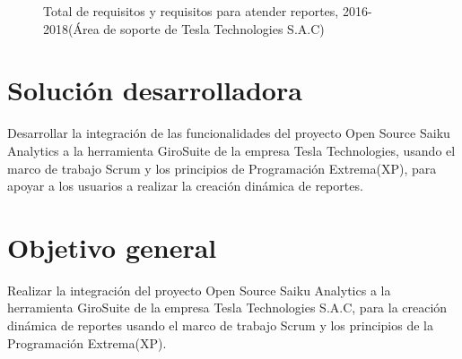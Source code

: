 \begin{spacing}{1.5}
	\begin{figure}[H]
		\begin{center}
			\tikzI
		\end{center}
		\caption {\centering \small{Total de requisitos y requisitos para atender reportes,  2016-2018(\'{A}rea de soporte de Tesla Technologies S.A.C)}} \label{figure:chaperI_1}
	\end{figure}
	
\end{spacing}

\clearpage
\section{Soluci\'{o}n desarrolladora}
\begin{spacing}{1.5}
	Desarrollar la integraci\'{o}n de las funcionalidades del proyecto Open Source Saiku Analytics a la herramienta GiroSuite de la empresa Tesla Technologies, usando el marco de trabajo Scrum y los principios de Programaci\'{o}n Extrema(XP), para apoyar a los usuarios a realizar la creaci\'{o}n din\'{a}mica de reportes.
\end{spacing}
\section{Objetivo general}
\begin{spacing}{1.5}
	Realizar la integraci\'{o}n del proyecto Open Source Saiku Analytics a la herramienta GiroSuite de la empresa Tesla Technologies S.A.C, para la creaci\'{o}n din\'{a}mica de reportes  usando el marco de trabajo Scrum y los principios de la Programaci\'{o}n Extrema(XP).
\end{spacing}
